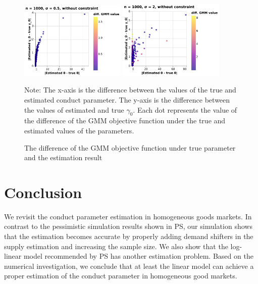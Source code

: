 \documentclass[11pt, a4paper]{article}
\begin{document}
\begin{figure}[!htbp]
  \begin{center}
  \includegraphics[width = 0.45\textwidth]
  {figuretable/diff_gmm_value_loglinear_loglinear_n_1000_sigma_0.5_non_constraint.pdf}
  \includegraphics[width = 0.45\textwidth]
  {figuretable/diff_gmm_value_loglinear_loglinear_n_1000_sigma_2_non_constraint.pdf}
  \caption{The difference of the GMM objective function under true parameter and the estimation result}
  \label{fg:diff_gmm_loglinear_loglinear} 
  \end{center}
  \footnotesize
  Note: The x-axis is the difference between the values of the true and estimated conduct parameter. The y-axis is the difference between the values of estimated and true $\gamma_0$. Each dot represents the value of the difference of the GMM objective function under the true and estimated values of the parameters. 
\end{figure} 



\section{Conclusion}
We revisit the conduct parameter estimation in homogeneous goods markets. In contrast to the pessimistic simulation results shown in PS, our simulation shows that the estimation becomes accurate by properly adding demand shifters in the supply estimation and increasing the sample size. We also show that the log-linear model recommended by PS has another estimation problem. Based on the numerical investigation, we conclude that at least the linear model can achieve a proper estimation of the conduct parameter in homogeneous good markets.
\end{document}

